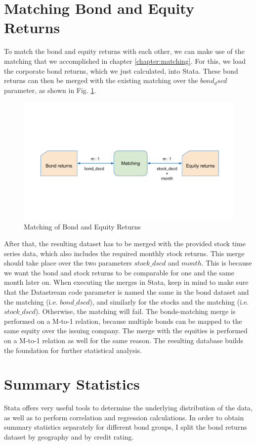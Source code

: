 \section{Matching Bond and Equity Returns}
To match the bond and equity returns with each other, we can make use of the matching that we accomplished in chapter \ref{chapter:matching}. For this, we load the corporate bond returns, which we just calculated, into Stata. These bond returns can then be merged with the existing matching over the $bond_dscd$ parameter, as shown in Fig. \ref{fig:matching-returns}. 
\begin{figure}[h]
	\centering
	\includegraphics[trim={0 4.5cm 0 5cm},clip,width=1.0\linewidth]{figures/matching-returns.pdf}
	\caption{Matching of Bond and Equity Returns}
	\label{fig:matching-returns}
\end{figure}
After that, the resulting dataset has to be merged with the provided stock time series data, which also includes the required monthly stock returns. This merge should take place over the two parameters $stock\_dscd$ and $month$. This is because we want the bond and stock returns to be comparable for one and the same month later on. When executing the merges in Stata, keep in mind to make sure that the Datastream code parameter is named the same in the bond dataset and the matching (i.e. $bond\_dscd$), and similarly for the stocks and the matching (i.e. $stock\_dscd$). Otherwise, the matching will fail. The bonds-matching merge is performed on a M-to-1 relation, because multiple bonds can be mapped to the same equity over the issuing company. The merge with the equities is performed on a M-to-1 relation as well for the same reason. The resulting database builds the foundation for further statistical analysis. 

\section{Summary Statistics} \label{section:summary-statistics}
Stata offers very useful tools to determine the underlying distribution of the data, as well as to perform correlation and regression calculations. In order to obtain summary statistics separately for different bond groups, I split the bond returns dataset by geography and by credit rating. 

